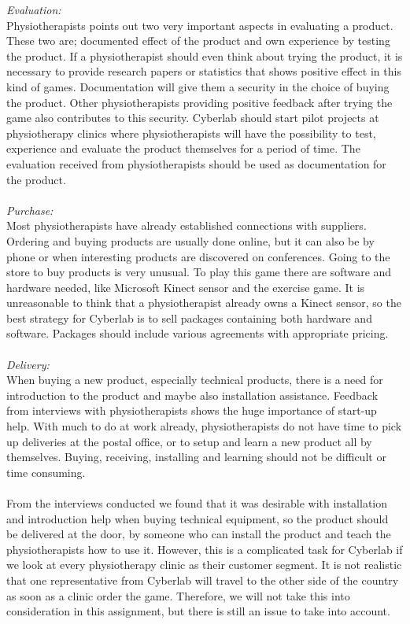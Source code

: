 \emph{Evaluation:}\\
Physiotherapists points out two very important aspects in evaluating a product. These two are; documented effect of the product and own experience by testing the product. If a physiotherapist should even think about trying the product, it is necessary to provide research papers or statistics that shows positive effect in this kind of games. Documentation will give them a security in the choice of buying the product. Other physiotherapists providing positive feedback after trying the game also contributes to this security. Cyberlab should start pilot projects at physiotherapy clinics where physiotherapists will have the possibility to test, experience and evaluate the product themselves for a period of time. The evaluation received from physiotherapists should be used as documentation for the product.\\ \\
\emph{Purchase:} \\
Most physiotherapists have already established connections with suppliers. Ordering and buying products are usually done online, but it can also be by phone or when interesting products are discovered on conferences. Going to the store to buy products is very unusual. To play this game there are software and hardware needed, like Microsoft Kinect sensor and the exercise game. It is unreasonable to think that a physiotherapist already owns a Kinect sensor, so the best strategy for Cyberlab is to sell packages containing both hardware and software. Packages should include various agreements with appropriate pricing. \\ \\
\emph{Delivery:}\\
When buying a new product, especially technical products, there is a need for introduction to the product and maybe also installation assistance. Feedback from interviews with physiotherapists shows the huge importance of start-up help. With much to do at work already, physiotherapists do not have time to pick up deliveries at the postal office, or to setup and learn a new product all by themselves. Buying, receiving, installing and learning should not be difficult or time consuming. \\ \\
From the interviews conducted we found that it was desirable with installation and introduction help when buying technical equipment, so the product should be delivered at the door, by someone who can install the product and teach the physiotherapists how to use it. However, this is a complicated task for Cyberlab if we look at every physiotherapy clinic as their customer segment. It is not realistic that one representative from Cyberlab will travel to the other side of the country as soon as a clinic order the game. Therefore, we will not take this into consideration in this assignment, but there is still an issue to take into account.\\ \\
 
